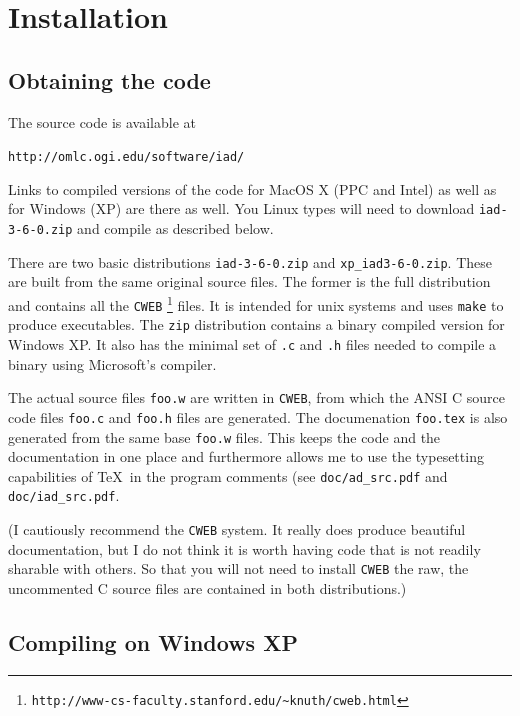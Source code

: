 \documentclass{article}
\begin{document}
\clearpage
\section{Installation}

\subsection{Obtaining the code}

The source code is available at
\begin{center}
\texttt{http://omlc.ogi.edu/software/iad/}
\end{center}
Links to compiled versions of the code for MacOS X (PPC and Intel) as well as
for Windows (XP) are there as well.  You Linux types will need to download 
\texttt{iad-3-6-0.zip} and compile as described below.

There are two basic distributions \texttt{iad-3-6-0.zip} and \texttt{xp\_iad3-6-0.zip}.
These are built from the same original source files.  
The former is the full distribution and contains all the \texttt{CWEB}%
\footnote{\texttt{http://www-cs-faculty.stanford.edu/\~{}knuth/cweb.html}}
files.  It is intended for unix systems and uses \texttt{make} to produce
executables.  The \texttt{zip} distribution contains a binary compiled version
for Windows XP.  It also has the minimal set of \texttt{.c} and \texttt{.h} 
files needed to compile a binary using Microsoft's compiler.

The actual source files \texttt{foo.w} are  written in \texttt{CWEB}, from which the
ANSI C source code files \texttt{foo.c} and \texttt{foo.h} files are 
generated.  The documenation \texttt{foo.tex} is also generated from the same
base \texttt{foo.w} files.  This keeps the code and the documentation in one
place and furthermore allows me to use the typesetting  capabilities of \TeX\ in
the program comments (see \texttt{doc/ad\_src.pdf} and \texttt{doc/iad\_src.pdf}.

(I cautiously recommend the \texttt{CWEB} system.  It
really does produce beautiful documentation, but I do not think it is worth
having code that is not readily sharable with others.
So that you will not need to install \texttt{CWEB} the raw, the
uncommented C source files are contained in both distributions.)

\subsection{Compiling on Windows XP}
\end{document}
